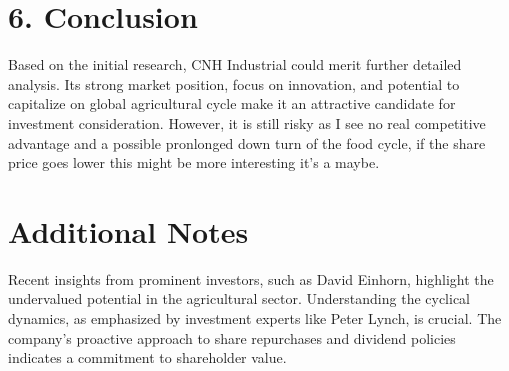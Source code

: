 \documentclass[12pt]{article}
\begin{document}
\section*{6. Conclusion}
Based on the initial research, CNH Industrial could merit further detailed analysis. Its strong market position, focus on innovation, and potential to capitalize on global agricultural cycle make it an attractive candidate for investment consideration. However, it is still risky as I see no real competitive advantage and a possible pronlonged down turn of the food cycle, if the share price goes lower this might be more interesting it's a maybe.

\section*{Additional Notes}
Recent insights from prominent investors, such as David Einhorn, highlight the undervalued potential in the agricultural sector. Understanding the cyclical dynamics, as emphasized by investment experts like Peter Lynch, is crucial. The company's proactive approach to share repurchases and dividend policies indicates a commitment to shareholder value.
\end{document}
